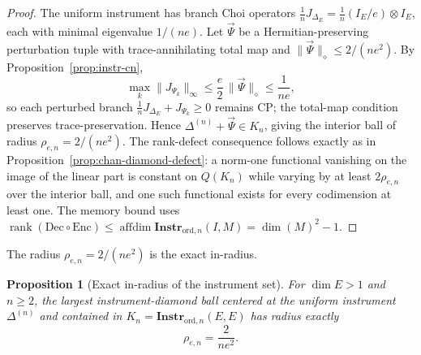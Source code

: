 \documentclass[11pt]{article}
\newtheorem{proposition}[theorem]{Proposition}
\DeclareMathOperator{\affdim}{affdim}
\DeclareMathOperator{\rank}{rank}
\begin{document}
\begin{proof}
The uniform instrument has branch Choi operators
$\tfrac1n J_{\Delta_E}=\tfrac1n(I_E/e)\otimes I_E$, each with minimal
eigenvalue $1/(ne)$. Let $\vec\Psi$ be a Hermitian-preserving perturbation
tuple with trace-annihilating total map and $\|\vec\Psi\|_\diamond\le2/(ne^2)$.
By Proposition~\ref{prop:instr-cn},
\[
\max_k\|J_{\Psi_k}\|_\infty\le\frac e2\,\|\vec\Psi\|_\diamond\le\frac1{ne},
\]
so each perturbed branch $\tfrac1n J_{\Delta_E}+J_{\Psi_k}\ge0$ remains CP; the
total-map condition preserves trace-preservation. Hence
$\Delta^{(n)}+\vec\Psi\in K_n$, giving the interior ball of radius
$\rho_{e,n}=2/(ne^2)$. The rank-defect consequence follows exactly as in
Proposition~\ref{prop:chan-diamond-defect}: a norm-one functional vanishing on
the image of the linear part is constant on $Q(K_n)$ while varying by at least
$2\rho_{e,n}$ over the interior ball, and one such functional exists for every
codimension at least one. The memory bound uses
$\rank(\mathrm{Dec}\circ\mathrm{Enc})\le\affdim\mathbf{Instr}_{\mathrm{ord},n}(I,M)
=\dim(M)^2-1$.
\end{proof}

The radius $\rho_{e,n}=2/(ne^2)$ is the exact in-radius.

\begin{proposition}[Exact in-radius of the instrument set]
\label{prop:instr-inradius}
For $\dim E>1$ and $n\ge2$, the largest instrument-diamond ball centered at the
uniform instrument $\Delta^{(n)}$ and contained in
$K_n=\mathbf{Instr}_{\mathrm{ord},n}(E,E)$ has radius exactly
\[
\rho_{e,n}=\frac{2}{ne^2}.
\]
\end{proposition}
\end{document}
